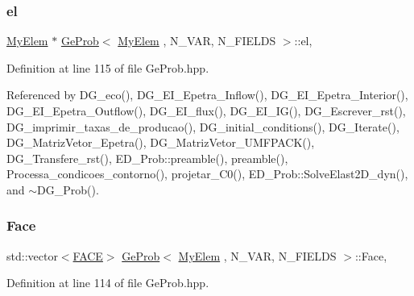 \subsubsection{\texorpdfstring{el}{el}}
{\footnotesize\ttfamily \hyperlink{DG__Prob_8h_a83cd887ced9a6587428f267e50cd4787}{My\+Elem} $\ast$ \hyperlink{classGeProb}{Ge\+Prob}$<$ \hyperlink{DG__Prob_8h_a83cd887ced9a6587428f267e50cd4787}{My\+Elem} , N\+\_\+\+V\+AR, N\+\_\+\+F\+I\+E\+L\+DS $>$\+::el\hspace{0.3cm}{\ttfamily [protected]}, {\ttfamily [inherited]}}



Definition at line 115 of file Ge\+Prob.\+hpp.



Referenced by D\+G\+\_\+eco(), D\+G\+\_\+\+E\+I\+\_\+\+Epetra\+\_\+\+Inflow(), D\+G\+\_\+\+E\+I\+\_\+\+Epetra\+\_\+\+Interior(), D\+G\+\_\+\+E\+I\+\_\+\+Epetra\+\_\+\+Outflow(), D\+G\+\_\+\+E\+I\+\_\+flux(), D\+G\+\_\+\+E\+I\+\_\+\+I\+G(), D\+G\+\_\+\+Escrever\+\_\+rst(), D\+G\+\_\+imprimir\+\_\+taxas\+\_\+de\+\_\+producao(), D\+G\+\_\+initial\+\_\+conditions(), D\+G\+\_\+\+Iterate(), D\+G\+\_\+\+Matriz\+Vetor\+\_\+\+Epetra(), D\+G\+\_\+\+Matriz\+Vetor\+\_\+\+U\+M\+F\+P\+A\+C\+K(), D\+G\+\_\+\+Transfere\+\_\+rst(), E\+D\+\_\+\+Prob\+::preamble(), preamble(), Processa\+\_\+condicoes\+\_\+contorno(), projetar\+\_\+\+C0(), E\+D\+\_\+\+Prob\+::\+Solve\+Elast2\+D\+\_\+dyn(), and $\sim$\+D\+G\+\_\+\+Prob().

\mbox{\label{classGeProb_af050a3c4e639bd19028c49877aa10583}} 
\subsubsection{\texorpdfstring{Face}{Face}}
{\footnotesize\ttfamily std\+::vector$<$\hyperlink{structFACE}{F\+A\+CE}$>$ \hyperlink{classGeProb}{Ge\+Prob}$<$ \hyperlink{DG__Prob_8h_a83cd887ced9a6587428f267e50cd4787}{My\+Elem} , N\+\_\+\+V\+AR, N\+\_\+\+F\+I\+E\+L\+DS $>$\+::Face\hspace{0.3cm}{\ttfamily [protected]}, {\ttfamily [inherited]}}



Definition at line 114 of file Ge\+Prob.\+hpp.

\mbox{\label{classGeProb_a876f8c65be4b17f3c2b7b4b0605f34c1}} 
